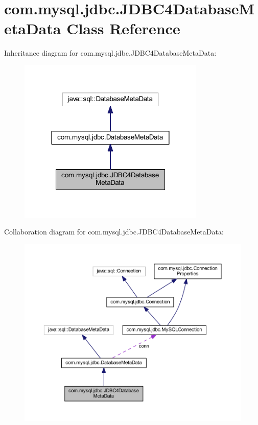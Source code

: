 \hypertarget{classcom_1_1mysql_1_1jdbc_1_1_j_d_b_c4_database_meta_data}{}\section{com.\+mysql.\+jdbc.\+J\+D\+B\+C4\+Database\+Meta\+Data Class Reference}
\label{classcom_1_1mysql_1_1jdbc_1_1_j_d_b_c4_database_meta_data}


Inheritance diagram for com.\+mysql.\+jdbc.\+J\+D\+B\+C4\+Database\+Meta\+Data\+:
\nopagebreak
\begin{figure}[H]
\begin{center}
\leavevmode
\includegraphics[width=252pt]{classcom_1_1mysql_1_1jdbc_1_1_j_d_b_c4_database_meta_data__inherit__graph}
\end{center}
\end{figure}


Collaboration diagram for com.\+mysql.\+jdbc.\+J\+D\+B\+C4\+Database\+Meta\+Data\+:
\nopagebreak
\begin{figure}[H]
\begin{center}
\leavevmode
\includegraphics[width=350pt]{classcom_1_1mysql_1_1jdbc_1_1_j_d_b_c4_database_meta_data__coll__graph}
\end{center}
\end{figure}
